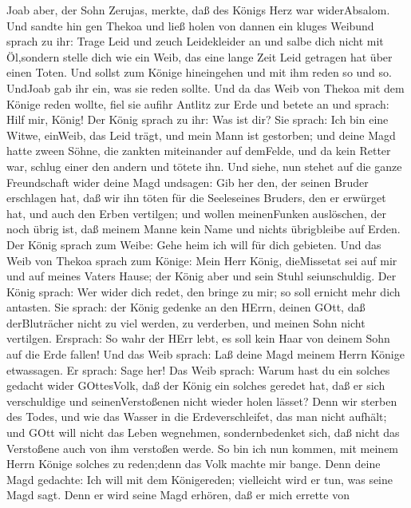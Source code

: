  Joab aber, der Sohn Zerujas, merkte, daß des Königs Herz
war widerAbsalom.  Und sandte hin gen Thekoa und ließ holen
von dannen ein kluges Weibund sprach zu ihr: Trage Leid und zeuch
Leidekleider an und salbe dich nicht mit Öl,sondern stelle dich wie ein
Weib, das eine lange Zeit Leid getragen hat über einen Toten.
 Und sollst zum Könige hineingehen und mit ihm reden so und
so. UndJoab gab ihr ein, was sie reden sollte.  Und da das
Weib von Thekoa mit dem Könige reden wollte, fiel sie aufihr Antlitz zur
Erde und betete an und sprach: Hilf mir, König!  Der König
sprach zu ihr: Was ist dir? Sie sprach: Ich bin eine Witwe, einWeib, das
Leid trägt, und mein Mann ist gestorben;  und deine Magd
hatte zween Söhne, die zankten miteinander auf demFelde, und da kein
Retter war, schlug einer den andern und tötete ihn.  Und
siehe, nun stehet auf die ganze Freundschaft wider deine Magd undsagen:
Gib her den, der seinen Bruder erschlagen hat, daß wir ihn töten für die
Seeleseines Bruders, den er erwürget hat, und auch den Erben vertilgen;
und wollen meinenFunken auslöschen, der noch übrig ist, daß meinem Manne
kein Name und nichts übrigbleibe auf Erden.  Der König
sprach zum Weibe: Gehe heim ich will für dich gebieten.  Und
das Weib von Thekoa sprach zum Könige: Mein Herr König, dieMissetat sei
auf mir und auf meines Vaters Hause; der König aber und sein Stuhl
seiunschuldig.  Der König sprach: Wer wider dich redet, den
bringe zu mir; so soll ernicht mehr dich antasten.  Sie
sprach: der König gedenke an den HErrn, deinen GOtt, daß derBluträcher
nicht zu viel werden, zu verderben, und meinen Sohn nicht vertilgen.
Ersprach: So wahr der HErr lebt, es soll kein Haar von deinem Sohn auf
die Erde fallen!  Und das Weib sprach: Laß deine Magd
meinem Herrn Könige etwassagen. Er sprach: Sage her!  Das
Weib sprach: Warum hast du ein solches gedacht wider GOttesVolk, daß der
König ein solches geredet hat, daß er sich verschuldige und
seinenVerstoßenen nicht wieder holen lässet?  Denn wir
sterben des Todes, und wie das Wasser in die Erdeverschleifet, das man
nicht aufhält; und GOtt will nicht das Leben wegnehmen, sondernbedenket
sich, daß nicht das Verstoßene auch von ihm verstoßen werde.
 So bin ich nun kommen, mit meinem Herrn Könige solches zu
reden;denn das Volk machte mir bange. Denn deine Magd gedachte: Ich will
mit dem Königereden; vielleicht wird er tun, was seine Magd sagt.
 Denn er wird seine Magd erhören, daß er mich errette von
